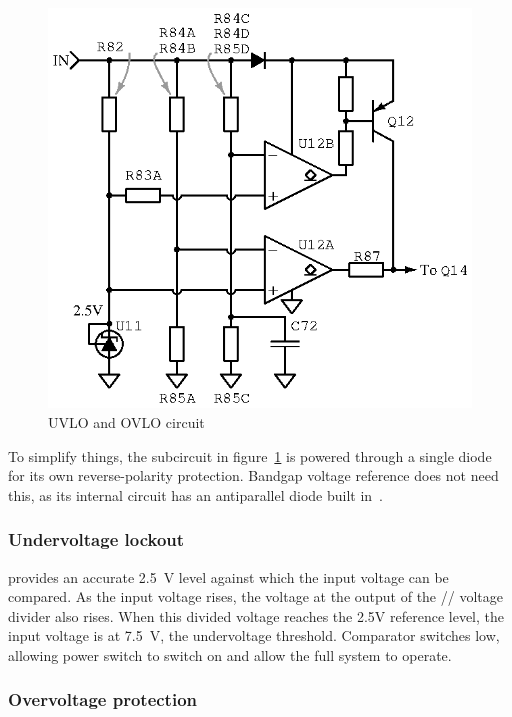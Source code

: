 \begin{figure}[H]
\centering
\includegraphics[]{comparator}
\caption{UVLO and OVLO circuit}
\label{fig:uovlo}
\end{figure}

To simplify things, the subcircuit in figure~\ref{fig:uovlo} is powered through
a single diode for its own reverse-polarity protection. Bandgap voltage reference
 does not need this, as its internal circuit has an antiparallel diode
built in~\cite{tl431}.

\subsubsection{Undervoltage lockout}

 provides an accurate 2.5~V level against which the input
voltage can be compared. As the input voltage rises, the voltage at the output of
the // voltage divider also rises. When
this divided voltage reaches the 2.5V reference level, the input voltage
is at 7.5~V, the undervoltage threshold. Comparator 
switches low, allowing power switch  to switch on and allow the
full system to operate.

\subsubsection{Overvoltage protection}

